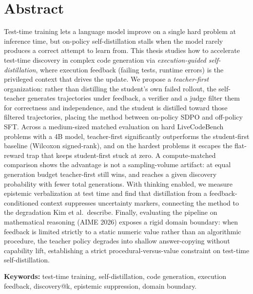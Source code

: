 \documentclass[12pt,a4paper]{report}
\begin{document}
\chapter*{Abstract}
Test-time training lets a language model improve on a single hard
problem at inference time, but on-policy self-distillation stalls when
the model rarely produces a correct attempt to learn from. This thesis
studies how to accelerate test-time discovery in complex code generation
via \emph{execution-guided self-distillation}, where execution feedback
(failing tests, runtime errors) is the privileged context that drives
the update. We propose a \emph{teacher-first} organization: rather than
distilling the student's own failed rollout, the self-teacher generates
trajectories under feedback, a verifier and a judge filter them for
correctness and independence, and the student is distilled toward those
filtered trajectories, placing the method between on-policy SDPO and
off-policy SFT. Across a medium-sized matched evaluation on hard
LiveCodeBench problems with a 4B model, teacher-first significantly
outperforms the student-first baseline (Wilcoxon signed-rank), and on
the hardest problems it escapes the flat-reward trap that keeps
student-first stuck at zero. A compute-matched comparison shows the
advantage is not a sampling-volume artifact: at equal generation budget
teacher-first still wins, and reaches a given discovery probability with
fewer total generations. With thinking enabled, we measure epistemic
verbalization at test time and find that distillation from a
feedback-conditioned context suppresses uncertainty markers, connecting
the method to the degradation Kim et al.~describe. Finally, evaluating the
pipeline on mathematical reasoning (AIME 2026) exposes a rigid domain
boundary: when feedback is limited strictly to a static numeric value
rather than an algorithmic procedure, the teacher policy degrades into
shallow answer-copying without capability lift, establishing a strict
procedural-versus-value constraint on test-time self-distillation.

\vspace{0.5cm}
\textbf{Keywords:} test-time training, self-distillation, code
generation, execution feedback, discovery@k, epistemic suppression,
domain boundary.

\tableofcontents

\clearpage
{}
\listoffigures

\clearpage
{}
\listoftables
\end{document}
